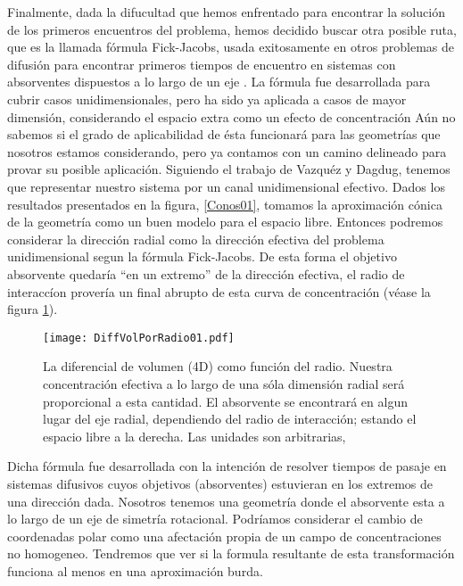 \documentclass[letterpaperr,12pt]{article}
\begin{document}
Finalmente, dada la difucultad que hemos enfrentado para encontrar la
solución de los primeros encuentros del problema, hemos decidido buscar
otra posible ruta, que es la llamada fórmula Fick-Jacobs, usada
exitosamente en otros problemas de difusión para encontrar primeros
tiempos de encuentro en sistemas con absorventes dispuestos a lo largo
de un eje \cite{Jacobs}. La fórmula fue desarrollada para cubrir casos
unidimensionales, pero ha sido ya aplicada a casos de mayor dimensión, 
considerando el espacio extra como un efecto de concentración \cite{Dagdug}
 Aún no sabemos
si el grado de aplicabilidad de ésta funcionará para las geometrías que nosotros
estamos considerando, pero ya contamos con un camino delineado para
provar su posible aplicación.
Siguiendo el trabajo de Vazquéz y Dagdug, tenemos que representar
nuestro sistema por un canal unidimensional efectivo. Dados los resultados presentados
en la figura, \ref{Conos01}, tomamos la aproximación cónica de la geometría como
un buen modelo para el espacio libre. Entonces podremos
considerar la dirección radial como la dirección efectiva del problema
unidimensional segun la fórmula Fick-Jacobs. De esta forma el 
objetivo absorvente quedaría ``en un extremo'' de la dirección efectiva,
el radio de interaccíon provería un final abrupto de esta curva
de concentración (véase la figura \ref{VolRadial}).

\begin{figure}[h]
  \centering
   \texttt{[image: DiffVolPorRadio01.pdf]}
   \caption{La diferencial de volumen (4D) como función del radio. Nuestra
concentración efectiva a lo largo de 
una sóla dimensión radial 
será proporcional a esta cantidad. 
El absorvente se encontrará en algun lugar del eje radial, dependiendo
del radio de interacción; estando
el espacio libre a la derecha. Las unidades son arbitrarias,
 }\label{VolRadial}
\end{figure}


Dicha fórmula fue desarrollada con la intención de resolver tiempos
de pasaje en sistemas difusivos cuyos objetivos (absorventes) estuvieran
en los extremos de una dirección dada. Nosotros tenemos una geometría donde
el absorvente esta a lo largo de un eje de simetría rotacional. 
Podríamos considerar el cambio de coordenadas polar como una
afectación propia de un campo de concentraciones no homogeneo. 
Tendremos que ver si la formula resultante de esta transformación funciona
al menos en una aproximación burda.


\end{document}
